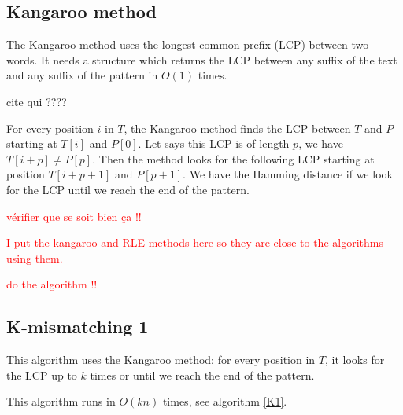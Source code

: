 \documentclass[preprint,12pt]{elsarticle}
\begin{document}



\subsection{Kangaroo method}

The Kangaroo method uses the longest common prefix (LCP) between two words.
It needs a structure which returns the LCP between any suffix of the text and any suffix of the pattern
in $O(1)$ times.

cite qui ????

For every position $i$ in $T$, the Kangaroo method finds the LCP between $T$ and $P$
starting at $T[i]$ and $P[0]$.
Let says this LCP is of length $p$, we have $T[i+p] \neq P[p]$.
Then the method looks for the following LCP starting at position $T[i+p+1]$ and $P[p+1]$.
We have the Hamming distance if we look for the LCP until we reach the end of the pattern.

\textcolor{red}{vérifier que se soit bien ça !!}

\textcolor{red}{I put the kangaroo and RLE methods here so they are close to the algorithms using them.}


\textcolor{red}{do the algorithm !!}

\subsection{K-mismatching 1}

This algorithm\cite{Kangaroo} uses the Kangaroo method:
for every position in $T$, it looks for the LCP up to $k$ times or until we reach the end of the pattern.

This algorithm runs in $O(kn)$ times, see algorithm \ref{K1}.



\end{document}
